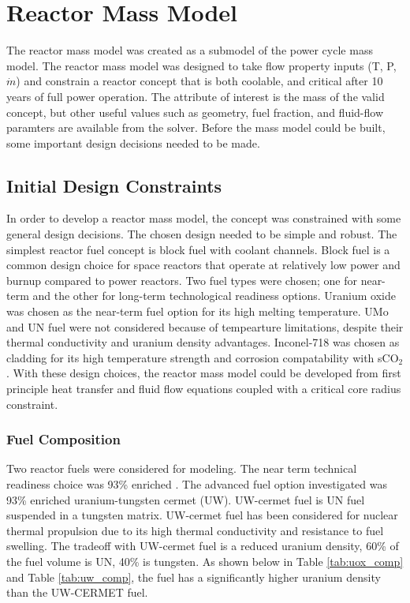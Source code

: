 \section{Reactor Mass Model} \label{sec:mass_model}
The reactor mass model was created as a submodel of the power cycle mass
model. The reactor mass model was designed to take flow property inputs (T, P,
$\dot{m}$) and constrain a reactor concept that is both coolable, and critical
after 10 years of full power operation. The attribute of interest is the mass of
the valid concept, but other useful values such as geometry, fuel fraction,
and fluid-flow paramters are available from the solver. Before the mass model
could be built, some important design decisions needed to be made.

\subsection{Initial Design Constraints}
    In order to develop a reactor mass model, the concept was constrained with
some general design decisions. The chosen design needed to be simple and robust. The simplest reactor fuel concept is block fuel with coolant channels. 
Block fuel is a common design choice for space reactors that operate at relatively 
low power and burnup compared to power reactors. Two fuel types were chosen; one for
near-term and the other for long-term technological readiness options. Uranium
oxide was chosen as the near-term fuel option for its high melting temperature.
UMo and UN fuel were not considered because of tempearture limitations, despite
their thermal conductivity and uranium density advantages. Inconel-718 was
chosen as cladding for its high temperature strength and corrosion
compatability with sCO$_2$. With these design choices, the reactor mass model
could be developed from first principle heat transfer and fluid flow equations
coupled with a critical core radius constraint.

\subsubsection{Fuel Composition}
Two reactor fuels were considered for modeling. The near term technical
readiness choice was 93\% enriched \uox. The advanced fuel option investigated
was 93\% enriched uranium-tungsten cermet (UW). UW-cermet fuel is UN fuel suspended in a
tungsten matrix. UW-cermet fuel has been considered for nuclear thermal
propulsion due to its high thermal conductivity and resistance to fuel swelling.
The tradeoff with UW-cermet fuel is a reduced uranium density, 60\% of the fuel
volume is UN, 40\% is tungsten. As shown below in Table \ref{tab:uox_comp} and
Table \ref{tab:uw_comp}, the \uox fuel has a significantly higher uranium
density than the UW-CERMET fuel.

